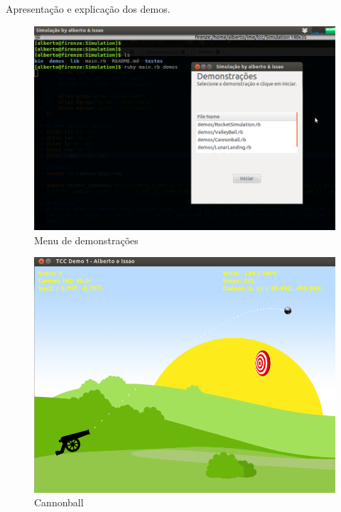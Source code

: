 Apresentação e explicação dos demos.

\begin{figure}[H]
	\centering
	\caption{Menu de demonstrações}
	\includegraphics[scale=0.4]{images/demos-menu.png}
	\hspace{0.5cm}
\end{figure}

\begin{figure}[H]
	\centering
	\caption{Cannonball}
	\includegraphics[scale=0.4]{images/cannonball.png}
	\hspace{0.5cm}
\end{figure}

